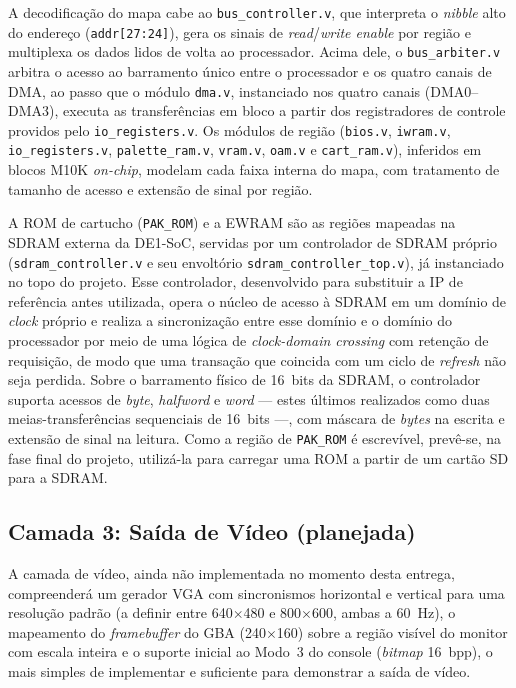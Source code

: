\documentclass[pnumromarab,times]{politex}
\begin{document}
A decodificação do mapa cabe ao \texttt{bus\_controller.v}, que
interpreta o \textit{nibble} alto do endereço (\texttt{addr[27:24]}),
gera os sinais de \emph{read}/\emph{write enable} por região e
multiplexa os dados lidos de volta ao processador. Acima dele, o
\texttt{bus\_arbiter.v} arbitra o acesso ao barramento único entre o
processador e os quatro canais de DMA, ao passo que o módulo
\texttt{dma.v}, instanciado nos quatro canais (DMA0--DMA3), executa as
transferências em bloco a partir dos registradores de controle providos pelo
\texttt{io\_registers.v}. Os módulos de região (\texttt{bios.v},
\texttt{iwram.v}, \texttt{io\_registers.v},
\texttt{palette\_ram.v}, \texttt{vram.v}, \texttt{oam.v} e
\texttt{cart\_ram.v}), inferidos em blocos M10K \textit{on-chip},
modelam cada faixa interna do mapa, com tratamento de tamanho de
acesso e extensão de sinal por região.

A ROM de cartucho (\texttt{PAK\_ROM}) e a EWRAM são as regiões mapeadas na
SDRAM externa da DE1-SoC, servidas por um controlador de SDRAM próprio
(\texttt{sdram\_controller.v} e seu envoltório
\texttt{sdram\_controller\_top.v}), já instanciado no topo do projeto.
Esse controlador, desenvolvido para substituir a IP de referência
antes utilizada, opera o núcleo de acesso à SDRAM em um domínio de
\textit{clock} próprio e realiza a sincronização entre esse domínio e
o domínio do processador por meio de uma lógica de \textit{clock-domain
crossing} com retenção de requisição, de modo que uma transação que
coincida com um ciclo de \textit{refresh} não seja perdida. Sobre o
barramento físico de 16~bits da SDRAM, o controlador suporta acessos de
\textit{byte}, \textit{halfword} e \textit{word} --- estes últimos
realizados como duas meias-transferências sequenciais de 16~bits ---,
com máscara de \textit{bytes} na escrita e extensão de sinal na leitura.
Como a região de \texttt{PAK\_ROM} é escrevível, prevê-se, na fase final
do projeto, utilizá-la para carregar uma ROM a partir de um cartão SD
para a SDRAM.

\subsection{Camada 3: Saída de Vídeo (planejada)}

A camada de vídeo, ainda não implementada no momento desta entrega,
compreenderá um gerador VGA com sincronismos horizontal e vertical
para uma resolução padrão (a definir entre 640$\times$480 e
800$\times$600, ambas a 60~Hz), o mapeamento do \textit{framebuffer}
do GBA (240$\times$160) sobre a região visível do monitor com escala
inteira e o suporte inicial ao Modo~3 do console (\textit{bitmap}
16~bpp), o mais simples de implementar e suficiente para demonstrar a
saída de vídeo.
\end{document}
